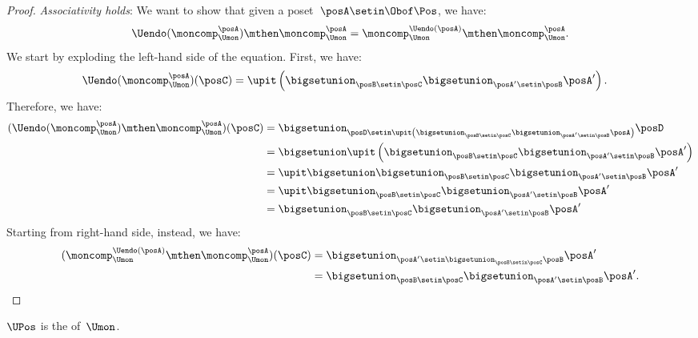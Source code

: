\begin{proof}
    \emph{Associativity holds}: We want to show that given a poset~$\posA\setin \Obof\Pos$, we have:
    \begin{equation}
        \Uendo(\moncomp_{\Umon}^{\posA})\mthen \moncomp_{\Umon}^{\posA}= \moncomp_{\Umon}^{\Uendo(\posA)}\mthen \moncomp_{\Umon}^{\posA}.
    \end{equation}
    We start by exploding the left-hand side of the equation.
    First, we have:
    \begin{equation}
        \begin{aligned}
            \Uendo(\moncomp_{\Umon}^{\posA})(\posC) & =\upit \left( \bigsetunion_{\posB\setin \posC}\bigsetunion_{\posA'\setin \posB} \posA'\right).
        \end{aligned}
    \end{equation}
    Therefore, we have:
    \begin{equation}
        \begin{aligned}
            (\Uendo(\moncomp_{\Umon}^{\posA})\mthen \moncomp_{\Umon}^{\posA})(\posC)
             & =\bigsetunion_{\posD \setin \upit \left( \bigsetunion_{\posB\setin \posC}\bigsetunion_{\posA'\setin \posB} \posA\right)} \posD \\
             & =\bigsetunion \upit \left( \bigsetunion_{\posB\setin \posC}\bigsetunion_{\posA'\setin \posB} \posA'\right) \\
             & =\upit \bigsetunion \bigsetunion_{\posB\setin \posC}\bigsetunion_{\posA'\setin \posB} \posA' \\
             & =\upit  \bigsetunion_{\posB\setin \posC}\bigsetunion_{\posA'\setin \posB} \posA' \\
             & = \bigsetunion_{\posB\setin \posC}\bigsetunion_{\posA'\setin \posB} \posA'
        \end{aligned}
    \end{equation}
    Starting from right-hand side, instead, we have:
    \begin{equation}
        \begin{aligned}
            (\moncomp_{\Umon}^{\Uendo(\posA)}\mthen \moncomp_{\Umon}^{\posA})(\posC)
             & =\bigsetunion_{\posA'\setin \bigsetunion_{\posB\setin \posC}\posB}\posA' \\
             & =\bigsetunion_{\posB\setin \posC}\bigsetunion_{\posA'\setin \posB} \posA'.
        \end{aligned}
    \end{equation}
\end{proof}

\begin{lemma}
    \label{lem:uposkleisli}
    $\UPos$ is the  of~$\Umon$.
\end{lemma}
